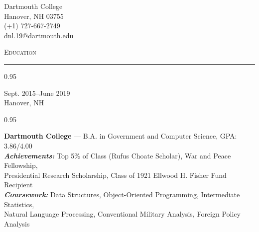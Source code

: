 \documentclass[a4paper,9pt]{article}
\newcommand{\mainMarginBottom}{\vspace*{1.5pt}}
\newcommand{\newLine}{\\}
\newcommand{\doubleColumnGap}{\hspace{4mm}}
\newcommand{\sectionMarginTopBottom}{\vspace*{9pt}}
\newcommand{\sectionMarginBetweenAdd}{\vspace{20pt}}
\newcommand{\mainLineSpacing}{0.95}
\newcommand{\titleMarginBelow}{\vspace*{2ex}}
\def\hrulefill{\leavevmode\leaders\hrule height 1.75pt\hfill\kern0pt}
\begin{document}
\begin{minipage}[b]{0.70\linewidth}
\end{minipage}
\begin{minipage}[b]{0.295\linewidth}
  \begin{flushright}
    \begin{small}
      Dartmouth College
      \newLine{}
      \mainMarginBottom{}
      Hanover, NH 03755
      \newLine{}
      \mainMarginBottom{}
      (+1) 727-667-2749
      \newLine{}
      \mainMarginBottom{}
      dnl.19@dartmouth.edu
    \end{small}
  \end{flushright}
\end{minipage}

\titleMarginBelow{}
\sectionMarginBetweenAdd{}

\hspace*{12pt}\textsc{\fontsize{20}{24}\selectfont Education}\hspace*{14pt}\hrulefill
\sectionMarginTopBottom{}

\begin{minipage}[t]{0.20\linewidth}
  \begin{small}
    \begin{spacing}\mainLineSpacing{}
      \begin{flushright}
        Sept. 2015--June 2019
        \newLine{}
        \mainMarginBottom{}
        Hanover, NH
      \end{flushright}
    \end{spacing}
  \end{small}
\end{minipage}
\doubleColumnGap{}
\begin{minipage}[t]{0.75\linewidth}
  \begin{small}
    \begin{spacing}\mainLineSpacing{}
      \begin{flushleft}
        \textbf{Dartmouth College} --- B.A. in Government and Computer Science, GPA: 3.86/4.00
        \newLine{}
        \mainMarginBottom{}
        \textit{\textbf{Achievements:}} Top 5\% of Class (Rufus Choate Scholar), War and Peace Fellowship,\\ Presidential Research Scholarship, Class of 1921 Ellwood H. Fisher Fund Recipient
        \newLine{}
        \mainMarginBottom{}
        \textit{\textbf{Coursework:}} Data Structures, Object-Oriented Programming, Intermediate Statistics,
        \\ Natural Language Processing, Conventional Military Analysis, Foreign Policy Analysis
      \end{flushleft}
    \end{spacing}
  \end{small}
\end{minipage}
\end{document}
